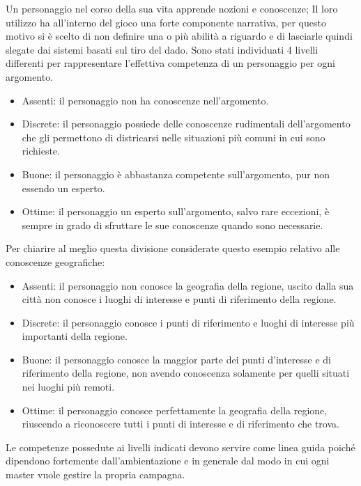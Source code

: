 \documentclass[../manuale_main.tex]{subfiles}
\begin{document}
Un personaggio nel corso della sua vita apprende nozioni e conoscenze; Il loro utilizzo ha all'interno del gioco una forte componente narrativa, per questo motivo si è scelto di non definire una o più abilità a riguardo e di lasciarle quindi slegate dai sistemi basati sul tiro del dado.
Sono stati individuati 4 livelli differenti per rappresentare l'effettiva competenza di un personaggio per ogni argomento.
\begin{itemize}
\item Assenti: il personaggio non ha conoscenze nell'argomento.
\item Discrete: il personaggio possiede delle conoscenze rudimentali dell'argomento che gli permettono di districarsi nelle situazioni più comuni in cui sono richieste.
\item Buone: il personaggio è abbastanza competente sull'argomento, pur non essendo un esperto.
\item Ottime: il personaggio un esperto sull'argomento, salvo rare eccezioni, è sempre in grado di sfruttare le sue conoscenze quando sono necessarie.
\end{itemize}

Per chiarire al meglio questa divisione considerate questo esempio relativo alle conoscenze geografiche: 

\begin{itemize}
\item Assenti: il personaggio non conosce la geografia della regione, uscito dalla sua città non conosce i luoghi di interesse e punti di riferimento della regione.
\item Discrete: il personaggio conosce i punti di riferimento e luoghi di interesse più importanti della regione.
\item Buone: il personaggio conosce la maggior parte dei punti d'interesse e di riferimento della regione, non avendo conoscenza solamente per quelli situati nei luoghi più remoti.
\item Ottime: il personaggio conosce perfettamente la geografia della regione, riuscendo a riconoscere tutti i punti di interesse e di riferimento che trova.
\end{itemize}
Le competenze possedute ai livelli indicati devono servire come linea guida poiché dipendono fortemente dall'ambientazione e in generale dal modo in cui ogni master vuole gestire la propria campagna.
\end{document}
